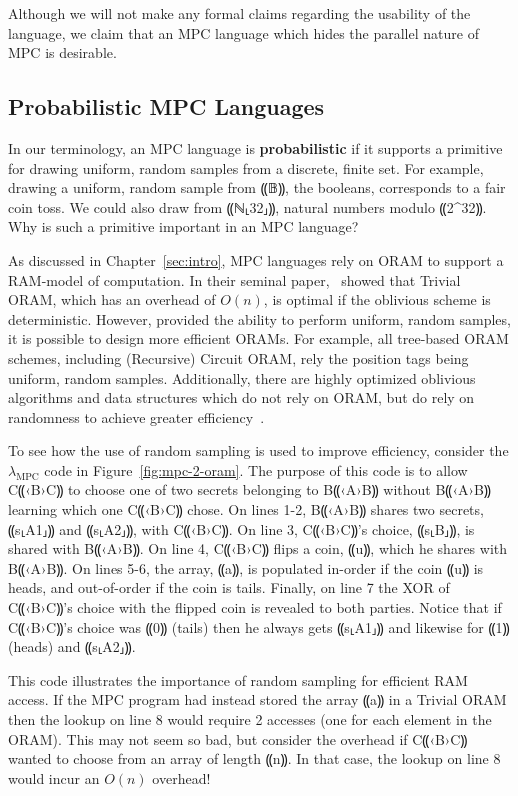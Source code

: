 \documentclass{report}
\newcommand{\mpc}{\ensuremath{\lambda_{\mathrm{MPC}}}\xspace}
\newcommand{\alice}{B⸨‹A›B⸩\xspace}
\newcommand{\bob}{C⸨‹B›C⸩\xspace}
\begin{document}
Although we will not make any formal claims regarding the usability of the language, we claim that an MPC language which hides the parallel
nature of MPC is desirable.

\subsection{Probabilistic MPC Languages}
\label{subsec:background-properties-probabilistic}

In our terminology, an MPC language is \textbf{probabilistic} if it supports a primitive for drawing uniform, random samples from a
discrete, finite set. For example, drawing a uniform, random sample from ⸨𝔹⸩, the booleans, corresponds to a fair coin toss. We
could also draw from ⸨ℕ⸤32⸥⸩, natural numbers modulo ⸨2^{32}⸩. Why is such a primitive important in an MPC language?

As discussed in Chapter~\ref{sec:intro}, MPC languages rely on ORAM to support a RAM-model of computation. In their seminal paper,~\citet{}
showed that Trivial ORAM, which has an overhead of $O(n)$, is optimal if the oblivious scheme is deterministic. However, provided the ability
to perform uniform, random samples, it is possible to design more efficient ORAMs. For example, all tree-based ORAM schemes, including
(Recursive) Circuit ORAM, rely the position tags being uniform, random samples. Additionally, there are highly
optimized oblivious algorithms and data structures which do not rely on ORAM, but do rely on randomness to achieve greater efficiency~\cite{}.

To see how the use of random sampling is used to improve efficiency, consider the \mpc{} code in Figure~\ref{fig:mpc-2-oram}. The purpose of
this code is to allow \bob to choose one of two secrets belonging to \alice without \alice learning which one \bob chose. On lines 1-2,
\alice shares two secrets, ⸨s⸤A1⸥⸩ and ⸨s⸤A2⸥⸩, with \bob. On line 3, \bob's choice, ⸨s⸤B⸥⸩, is shared with \alice.
On line 4, \bob flips a coin, ⸨u⸩, which he shares with \alice. On lines 5-6, the array, ⸨a⸩, is populated
in-order if the coin ⸨u⸩ is heads, and out-of-order if the coin is tails. Finally, on line 7 the XOR of \bob's choice with the flipped
coin is revealed to both parties. Notice that if \bob's choice was ⸨0⸩ (tails) then he always gets ⸨s⸤A1⸥⸩ and
likewise for ⸨1⸩ (heads) and ⸨s⸤A2⸥⸩.

This code illustrates the importance of random sampling for efficient RAM access. If the MPC program had instead stored the array ⸨a⸩ in
a Trivial ORAM then the lookup on line 8 would require 2 accesses (one for each element in the ORAM). This may not seem so bad, but consider
the overhead if \bob wanted to choose from an array of length ⸨n⸩. In that case, the lookup on line 8 would incur an $O(n)$ overhead!
\end{document}
